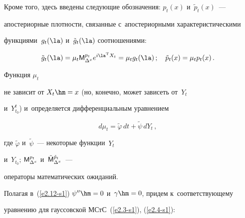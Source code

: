 Кроме того, здесь введены следующие обозначения: $p_t(x)$  и~$\tilde p_t(x)$~--- 

апостериорные плотности, связанные с~апостериорными характеристическими 

функциями~$g_t(\la)$  и~$\tilde g_t(\la)$ соотношениями:

\begin{equation*}

{\tilde g}_t (\la) = \mu_t {\sf M}_{\Delta^x}^{p_t} e^{i\la^{\mathrm{T}} X_t} = 

\mu_t g_t (\la)\,;\quad

{\tilde p}_t (x)=\mu_t p_t(x)\,.


\end{equation*}

Функция $\mu_t$

не зависит от  $X_t \hm=x$ (но, конечно, может зависеть от~$Y_t$

и~$Y_{t_0}^t$) и~определяется дифференциальным уравнением

\begin{equation}

d\mu_t ={\tilde\varphi}\, dt +{\tilde \psi}\, dY_t\,,\label{e2.16-s1}

\end{equation}

где $\tilde\varphi$ и~$\tilde\psi$~--- некоторые функции~$Y_t$

и~$Y_{t_0}$; ${\sf M}_{\Delta^x}^{p_t}$ и~$\tilde{\sf M}_{\Delta^x}^{\tilde p_t}$~--- 

операторы математических ожиданий.



Полагая в~(\ref{e2.12-s1}) $\psi'' \hm=0$ и~$\gamma\hm=0$, придем к~соответствующему 

уравнению для гауссовской МСтС~(\ref{e2.3-s1}), (\ref{e2.4-s1}):



\noindent

